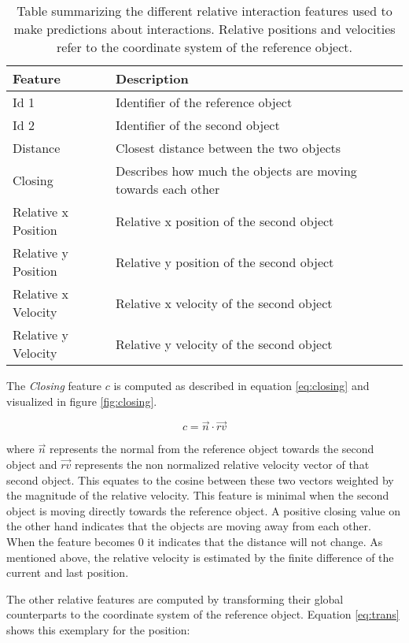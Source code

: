\begin{table}
	\centering
	\begin{tabular*}{\textwidth}{@{\extracolsep{\fill} } l l}
		\hline \textbf{Feature} & \textbf{Description} \\ 
		\hline \hline 
		 Id 1 & Identifier of the reference object \\ 
		 Id 2 & Identifier of the second object \\ 
		 Distance & Closest distance between the two objects \\
		 Closing & Describes how much the objects are moving towards each other \\
		 Relative x Position & Relative x position of the second object \\
		 Relative y Position & Relative y position of the second object \\
		 Relative x Velocity & Relative x velocity of the second object \\
		 Relative y Velocity & Relative y velocity of the second object \\
		\hline 
	\end{tabular*} 
	\caption{Table summarizing the different relative interaction features used to make predictions about interactions. Relative positions and velocities refer to the coordinate system of the reference object.}
	\label{tab:gateInteractionFeatures}
\end{table}

The \textit{Closing} feature $c$ is computed as described in equation \ref{eq:closing} and visualized in figure \ref{fig:closing}.

\begin{equation}
  c = \vec{n} \cdot \vec{rv}
 \label{eq:closing}
\end{equation}

where $\vec{n}$ represents the normal from the reference object towards the second object and $\vec{rv}$ represents the non normalized relative velocity vector of that second object. This equates to the cosine between these two vectors weighted by the magnitude of the relative velocity. This feature is minimal when the second object is moving directly towards the reference object. A positive closing value on the other hand indicates that the objects are moving away from each other. When the feature becomes 0 it indicates that the distance will not change. As mentioned above, the relative velocity is estimated by the finite difference of the current and last position.

The other relative features are computed by transforming their global counterparts to the coordinate system of the reference object. Equation \ref{eq:trans} shows this exemplary for the position:

